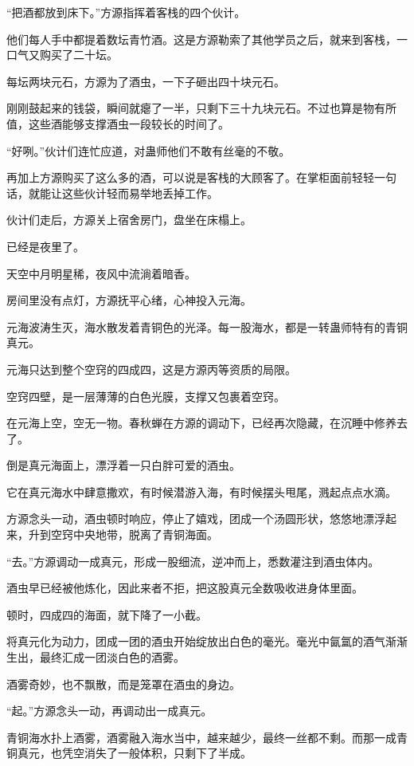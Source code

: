 
\begin{this_body}

“把酒都放到床下。”方源指挥着客栈的四个伙计。

他们每人手中都提着数坛青竹酒。这是方源勒索了其他学员之后，就来到客栈，一口气又购买了二十坛。

每坛两块元石，方源为了酒虫，一下子砸出四十块元石。

刚刚鼓起来的钱袋，瞬间就瘪了一半，只剩下三十九块元石。不过也算是物有所值，这些酒能够支撑酒虫一段较长的时间了。

“好咧。”伙计们连忙应道，对蛊师他们不敢有丝毫的不敬。

再加上方源购买了这么多的酒，可以说是客栈的大顾客了。在掌柜面前轻轻一句话，就能让这些伙计轻而易举地丢掉工作。

伙计们走后，方源关上宿舍房门，盘坐在床榻上。

已经是夜里了。

天空中月明星稀，夜风中流淌着暗香。

房间里没有点灯，方源抚平心绪，心神投入元海。

元海波涛生灭，海水散发着青铜色的光泽。每一股海水，都是一转蛊师特有的青铜真元。

元海只达到整个空窍的四成四，这是方源丙等资质的局限。

空窍四壁，是一层薄薄的白色光膜，支撑又包裹着空窍。

在元海上空，空无一物。春秋蝉在方源的调动下，已经再次隐藏，在沉睡中修养去了。

倒是真元海面上，漂浮着一只白胖可爱的酒虫。

它在真元海水中肆意撒欢，有时候潜游入海，有时候摆头甩尾，溅起点点水滴。

方源念头一动，酒虫顿时响应，停止了嬉戏，团成一个汤圆形状，悠悠地漂浮起来，升到空窍中央地带，脱离了青铜海面。

“去。”方源调动一成真元，形成一股细流，逆冲而上，悉数灌注到酒虫体内。

酒虫早已经被他炼化，因此来者不拒，把这股真元全数吸收进身体里面。

顿时，四成四的海面，就下降了一小截。

将真元化为动力，团成一团的酒虫开始绽放出白色的毫光。毫光中氤氲的酒气渐渐生出，最终汇成一团淡白色的酒雾。

酒雾奇妙，也不飘散，而是笼罩在酒虫的身边。

“起。”方源念头一动，再调动出一成真元。

青铜海水扑上酒雾，酒雾融入海水当中，越来越少，最终一丝都不剩。而那一成青铜真元，也凭空消失了一般体积，只剩下了半成。


\end{this_body}
